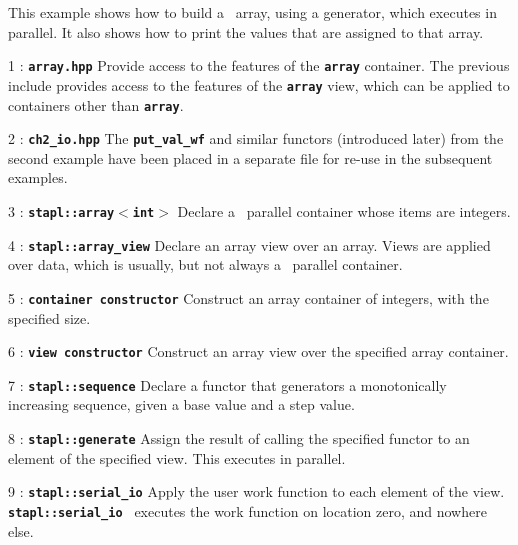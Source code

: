 \documentclass{report}
\begin{document}
This example shows how to build a \stapl\ array, using a generator,
which executes in parallel.
It also shows how to print the values that are assigned to that array.

\begin{hashitemize}
\item 1 : \texttt{{\bf array.hpp}}
\newline
Provide access to the features of the
\texttt{{\bf array}}
container.
The previous include provides access to the features of the
\texttt{{\bf array}}
view, which can be applied to containers other than
\texttt{{\bf array}}.

\item 2 : \texttt{{\bf ch2\_io.hpp}}
\newline
The
\texttt{{\bf put\_val\_wf}}
and similar functors (introduced later)
from the second example have been placed in a separate file
for re-use in the subsequent examples.

\item 3 : \texttt{{\bf stapl::array$<$int$>$}}
\newline
Declare a \stapl\ parallel container whose items are integers.

\item 4 : \texttt{{\bf stapl::array\_view}}
\newline
Declare an array view over an array.
Views are applied over data, which is usually, but not always
a \stapl\ parallel container.

\item 5 : \texttt{{\bf container constructor}}
\newline
Construct an array container of integers, with the specified size.

\item 6 : \texttt{{\bf view constructor}}
\newline
Construct an array view over the specified array container.

\item 7 : \texttt{{\bf stapl::sequence}}
\newline
Declare a functor that generators a monotonically increasing sequence,
given a base value and a step value.

\item 8 : \texttt{{\bf stapl::generate}}
\newline
Assign the result of calling the specified functor to an element
of the specified view.  This executes in parallel.

\item 9 : \texttt{{\bf stapl::serial\_io}}
\newline
Apply the user work function to each element of the view.
\texttt{{\bf stapl::serial\_io }}
executes the work function on location zero, and nowhere else.

\end{hashitemize}
\end{document}
